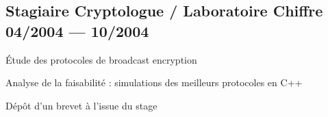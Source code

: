 \subsection{{Stagiaire Cryptologue / Laboratoire Chiffre \hfill 04/2004  --- 10/2004}}
\begin{zitemize}
\item \'Etude des protocoles de broadcast encryption
\item Analyse de la faisabilité : simulations des meilleurs protocoles en C++
\item Dépôt d'un brevet à l'issue du stage
\end{zitemize}


